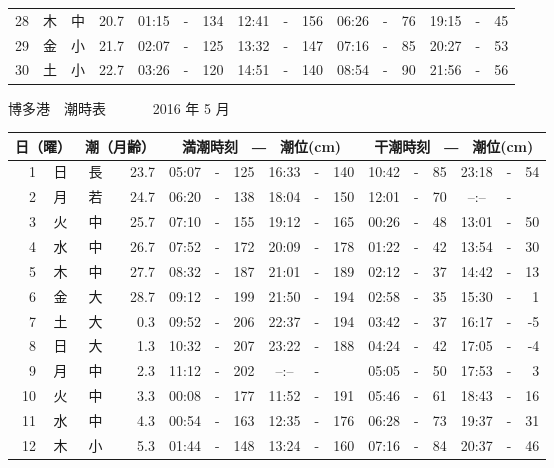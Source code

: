 \documentclass[12pt.a4j]{jsarticle}
\begin{document}
\begin{center}
\begin{table}[ht]
\begin{tabular}{|rc|cr|ccrccr|ccrccr|}
28 & 木 & 中 & 20.7 &  01:15 &-& 134  &  12:41 &-& 156  &   06:26 &-&  76  &   19:15 &-&  45  \\
29 & 金 & 小 & 21.7 &  02:07 &-& 125  &  13:32 &-& 147  &   07:16 &-&  85  &   20:27 &-&  53  \\
30 & 土 & 小 & 22.7 &  03:26 &-& 120  &  14:51 &-& 140  &   08:54 &-&  90  &   21:56 &-&  56  \\
   \hline
   \end{tabular}
\end{table}
\newpage
 {\LARGE 博多港　潮時表　　　}
 {\large 2016 年  5 月}\\
 \begin{table}[ht]
    \begin{tabular}{|rc|cr|ccrccr|ccrccr|}
    \hline
    \multicolumn{2}{|c|}{日（曜）} & \multicolumn{2}{c|}{潮（月齢）} & \multicolumn{6}{c|}{満潮時刻　―　潮位(cm)} & \multicolumn{6}{c|}{干潮時刻　―　潮位(cm)} \\
 \hline
 1 & 日 & 長 & 23.7 &  05:07 &-& 125  &  16:33 &-& 140  &   10:42 &-&  85  &   23:18 &-&  54  \\
 2 & 月 & 若 & 24.7 &  06:20 &-& 138  &  18:04 &-& 150  &   12:01 &-&  70  &   --:-- &-&     \\
 3 & 火 & 中 & 25.7 &  07:10 &-& 155  &  19:12 &-& 165  &   00:26 &-&  48  &   13:01 &-&  50  \\
 4 & 水 & 中 & 26.7 &  07:52 &-& 172  &  20:09 &-& 178  &   01:22 &-&  42  &   13:54 &-&  30  \\
 5 & 木 & 中 & 27.7 &  08:32 &-& 187  &  21:01 &-& 189  &   02:12 &-&  37  &   14:42 &-&  13  \\
 6 & 金 & 大 & 28.7 &  09:12 &-& 199  &  21:50 &-& 194  &   02:58 &-&  35  &   15:30 &-&   1  \\
 7 & 土 & 大 &  0.3 &  09:52 &-& 206  &  22:37 &-& 194  &   03:42 &-&  37  &   16:17 &-&  -5  \\
 8 & 日 & 大 &  1.3 &  10:32 &-& 207  &  23:22 &-& 188  &   04:24 &-&  42  &   17:05 &-&  -4  \\
 9 & 月 & 中 &  2.3 &  11:12 &-& 202  &  --:-- &-&     &   05:05 &-&  50  &   17:53 &-&   3  \\
10 & 火 & 中 &  3.3 &  00:08 &-& 177  &  11:52 &-& 191  &   05:46 &-&  61  &   18:43 &-&  16  \\
11 & 水 & 中 &  4.3 &  00:54 &-& 163  &  12:35 &-& 176  &   06:28 &-&  73  &   19:37 &-&  31  \\
12 & 木 & 小 &  5.3 &  01:44 &-& 148  &  13:24 &-& 160  &   07:16 &-&  84  &   20:37 &-&  46  \\

\end{tabular}
\end{table}
\end{center}
\end{document}
